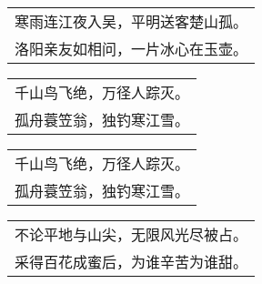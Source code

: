 \nopagebreak%
\nopagebreak%
\noindent\begin{minipage}{\linewidth}
  \vskip-3pt\begin{table}[H]
    \centering
    \begin{tabular}{@{}l@{}}
寒雨连江夜入吴，平明送客楚山孤。\\
洛阳亲友如相问，一片冰心在玉壶。
    \end{tabular}
  \end{table}
\end{minipage}
\vspace{1cm}


\nopagebreak%
\nopagebreak%
\noindent\begin{minipage}{\linewidth}
  \vskip-3pt\begin{table}[H]
    \centering
    \begin{tabular}{@{}l@{}}
千山鸟飞绝，万径人踪灭。\\
孤舟蓑笠翁，独钓寒江雪。
    \end{tabular}
  \end{table}
\end{minipage}
\vspace{1cm}


\nopagebreak%
\nopagebreak%
\noindent\begin{minipage}{\linewidth}
  \vskip-3pt\begin{table}[H]
    \centering
    \begin{tabular}{@{}l@{}}
千山鸟飞绝，万径人踪灭。\\
孤舟蓑笠翁，独钓寒江雪。
    \end{tabular}
  \end{table}
\end{minipage}
\vspace{1cm}


\nopagebreak%
\nopagebreak%
\noindent\begin{minipage}{\linewidth}
  \vskip-3pt\begin{table}[H]
    \centering
    \begin{tabular}{@{}l@{}}
不论平地与山尖，无限风光尽被占。\\
采得百花成蜜后，为谁辛苦为谁甜。
    \end{tabular}
  \end{table}
\end{minipage}
\vspace{1cm}


